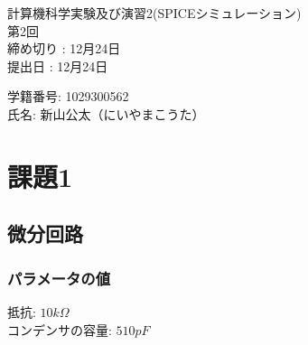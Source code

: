 \documentclass{jsarticle}
\begin{document}
\begin{titlepage}
    \begin{center}
        \vspace*{12pt}
        {\huge 計算機科学実験及び演習2(SPICEシミュレーション)}
        \vspace{12pt}\\
        {第2回}
        \vspace{60pt}\\
        {締め切り : 12月24日}
        \vspace{12pt}\\
        {提出日 : 12月24日}
    \end{center}

    \vspace{400pt}
    \begin{flushright}
       {\large 学籍番号: 1029300562\\
        氏名: 新山公太（にいやまこうた）}
    \end{flushright}

    
\end{titlepage}

\section{課題1}
\subsection{微分回路}
\subsubsection{パラメータの値}
\begin{flushleft}
抵抗: $10k\Omega$\\
コンデンサの容量: $510pF$
\end{flushleft}
\end{document}
